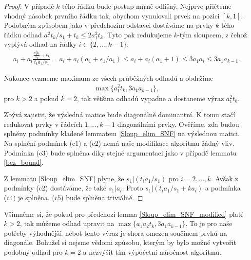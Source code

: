 \begin{proof}
V případě $ k $-tého řádku bude postup mírně odlišný. Nejprve přičteme vhodný 
násobek prvního řádku tak, abychom vynulovali prvek na pozici $ [k, 1] $. 
Podobným způsobem jako v předchozím odstavci dostáváme na prvky $ k $-tého řádku
odhad $ a_1^2 t_k / s_1 + t_k \leq 2 a_1^2 t_k $. Tyto pak redukujeme $ k $-tým 
sloupcem, z čehož vyplývá odhad na řádky $ i \in \{ 2, \dots, k - 1 \} $:
\begin{align*}
    a_i + a_i \frac{\frac{a_1^2 t_k}{s_1} + t_k}{t_k a_1 / s_1} 
        = a_i + a_i (a_1 + s_1 / a_1)
        \leq a_i + a_i (a_1 + 1) 
        \leq 3 a_1 a_i
        \leq 3 a_1 a_{k - 1}.
\end{align*}

Nakonec vezmeme maximum ze všech průběžných odhadů a obdržíme
\begin{align*}
    \max\{ a_1^2 t_k, 3 a_1 a_{k - 1} \},
\end{align*}
pro $ k > 2 $ a pokud $ k = 2 $, tak většina odhadů vypadne a dostaneme výraz
$ a_1^2 t_k $.

Zbývá zajistit, že výsledná matice bude diagonálně dominantní. K tomu stačí 
redukovat prvky v řádcích $ 1, \dots, k - 1 $ diagonálními prvky. Ověříme, zda 
budou splněny podmínky kladené lemmatem \ref{Sloup_elim_SNF} na výslednou matici.
Na splnění podmínek (c1) a (c2) nemá naše modifikace algoritmu žádný vliv.
Podmínka (c3) bude splněna díky stejné argumentaci jako v případě lemmatu
\ref{bez_bound}.

Z lemmatu \ref{Sloup_elim_SNF} plyne, že $ s_1 \vert (t_i a_1/s_1) $ pro
$ i = 2, \dots, k $. Avšak z podmínky (c2) dostáváme, že také $ s_1 \vert a_i $.
Proto $ s_1 \vert (t_i a_1/s_1 + k a_i) $ a podmínka (c4) je splněna. (c5) bude 
splněna triviálně.

\end{proof}

\begin{pozn}
Všimněme si, že pokud pro předchozí lemma \ref{Sloup_elim_SNF_modified} platí
$ k > 2 $, tak můžeme odhad upravit na $ \max\{ a_1 a_2 t_k, 3 a_1 a_{k - 1} \} $.
To je pro naše potřeby výhodnější, neboť tento výraz je shora omezen součinem 
prvků na diagonále. Bohužel si nejsme vědomi způsobu, kterým by bylo možné 
vytvořit podobný odhad pro $ k = 2 $ a nezvýšit tím výpočetní náročnost
algoritmu.
\end{pozn}



